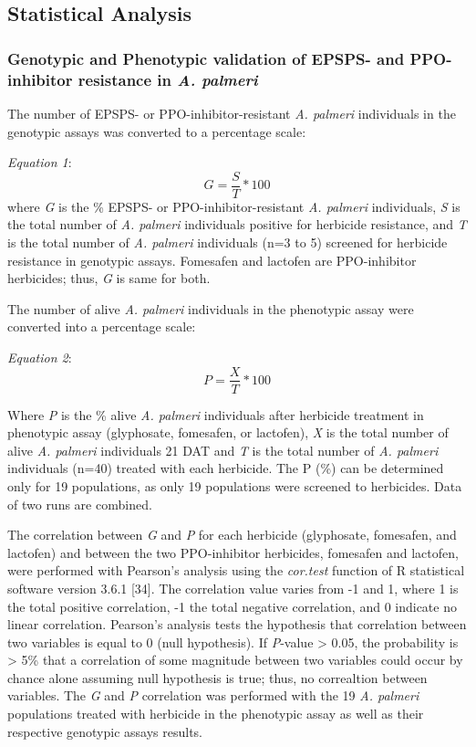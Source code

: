 \documentclass[10pt,letterpaper]{article}
\begin{document}
\hypertarget{statistical-analysis}{%
\subsection{Statistical Analysis}\label{statistical-analysis}}

\hypertarget{genotypic-and-phenotypic-validation-of-epsps--and-ppo-inhibitor-resistance-in-a.-palmeri}{%
\subsubsection{\texorpdfstring{Genotypic and Phenotypic validation of
EPSPS- and PPO-inhibitor resistance in \emph{A.
palmeri}}{Genotypic and Phenotypic validation of EPSPS- and PPO-inhibitor resistance in A. palmeri}}\label{genotypic-and-phenotypic-validation-of-epsps--and-ppo-inhibitor-resistance-in-a.-palmeri}}

The number of EPSPS- or PPO-inhibitor-resistant \emph{A. palmeri}
individuals in the genotypic assays was converted to a percentage scale:

\emph{Equation 1}: \[G=\frac{S}{T} * 100 \] \noindent where \emph{G} is
the \% EPSPS- or PPO-inhibitor-resistant \emph{A. palmeri} individuals,
\emph{S} is the total number of \emph{A. palmeri} individuals positive
for herbicide resistance, and \emph{T} is the total number of \emph{A.
palmeri} individuals (n=3 to 5) screened for herbicide resistance in
genotypic assays. Fomesafen and lactofen are PPO-inhibitor herbicides;
thus, \emph{G} is same for both.

The number of alive \emph{A. palmeri} individuals in the phenotypic
assay were converted into a percentage scale:

\emph{Equation 2}: \[P=\frac{X}{T} * 100 \]

Where \emph{P} is the \% alive \emph{A. palmeri} individuals after
herbicide treatment in phenotypic assay (glyphosate, fomesafen, or
lactofen), \emph{X} is the total number of alive \emph{A. palmeri}
individuals 21 DAT and \emph{T} is the total number of \emph{A. palmeri}
individuals (n=40) treated with each herbicide. The P (\%) can be
determined only for 19 populations, as only 19 populations were screened
to herbicides. Data of two runs are combined.

The correlation between \emph{G} and \emph{P} for each herbicide
(glyphosate, fomesafen, and lactofen) and between the two PPO-inhibitor
herbicides, fomesafen and lactofen, were performed with Pearson's
analysis using the \emph{cor.test} function of R statistical software
version 3.6.1 {[}34{]}. The correlation value varies from -1 and 1,
where 1 is the total positive correlation, -1 the total negative
correlation, and 0 indicate no linear correlation. Pearson's analysis
tests the hypothesis that correlation between two variables is equal to
0 (null hypothesis). If \emph{P}-value \textgreater{} 0.05, the
probability is \textgreater{} 5\% that a correlation of some magnitude
between two variables could occur by chance alone assuming null
hypothesis is true; thus, no correaltion between variables. The \emph{G}
and \emph{P} correlation was performed with the 19 \emph{A. palmeri}
populations treated with herbicide in the phenotypic assay as well as
their respective genotypic assays results.
\end{document}
